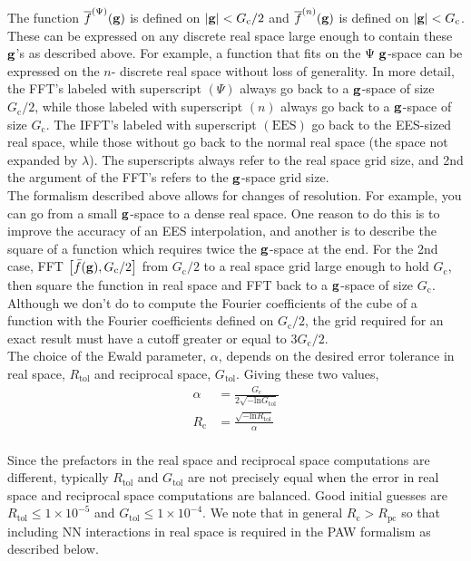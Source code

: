 \documentclass[paper=a4, fontsize=11pt]{article} %
\numberwithin{equation}{section} %
\numberwithin{figure}{section} %
\numberwithin{table}{section} %
\newcommand{\ol}{\overline}
\newcommand{\bg}{{\bf{g}}}
\newcommand{\rEES}{{\mathrm{EES}}}
\newcommand{\rtol}{{\mathrm{tol}}}
\newcommand{\Rc}{{R_{\mathrm{c}}}}
\newcommand{\Gc}{{G_{\mathrm{c}}}}
\newcommand{\Rpc}{{R_{\mathrm{pc}}}}
\begin{document}
The function $\ol f^{(\Psi)}(\bg)$ is defined on $|\bg| < \Gc/2$ and $\ol f^{(n)}(\bg)$ is defined on $|\bg| < \Gc$. These can be expressed on any discrete real space large enough to contain these $\bg$'s as described above. For example, a function that fits on the $\Psi\ \bg$-space can be expressed on the $n$- discrete real space without loss of generality. In more detail, the FFT's labeled with superscript $(\Psi)$ always go back to a $\bg$-space of size $\Gc/2$, while those labeled with superscript $(n)$ always go back to a $\bg$-space of size $\Gc$. The IFFT's labeled with superscript $(\rEES)$ go back to the EES-sized real space, while those without go back to the normal real space (the space not expanded by $\lambda$). The superscripts always refer to the real space grid size, and 2nd the argument of the FFT's refers to the $\bg$-space grid size. \\

The formalism described above allows for changes of resolution. For example, you can go from a small $\bg$-space to a dense real space. One reason to do this is to improve the accuracy of an EES interpolation, and another is to describe the square of a function which requires twice the $\bg$-space at the end. For the 2nd case, FFT $\left[ \bar f(\bg), \Gc/2\right]$ from $\Gc/2$ to a real space grid large enough to hold $\Gc$, then square the function in real space and FFT back to a $\bg$-space of size $\Gc$. Although we don't do to compute the Fourier coefficients of the cube of a function with the Fourier coefficients defined on $\Gc/2$, the grid required for an exact result must have a cutoff greater or equal to $3\Gc/2$. \\

The choice of the Ewald parameter, $\alpha$, depends on the desired error tolerance in real space, $R_\rtol$ and reciprocal space, $G_\rtol$. Giving these two values,
\begin{equation}\label{eq:Rcdef}
\begin{split}
         \alpha &= \frac{\Gc}{2\sqrt{-\mathrm{ln} G_\rtol}}\\
          \Rc     &= \frac{\sqrt{-\mathrm{ln} R_\rtol}}{\alpha}\\
\end{split}
\end{equation}


Since the prefactors in the real space and reciprocal space computations are different, typically $R_\rtol$ and $G_\rtol$ are not precisely equal when the error in real space and reciprocal space computations are balanced. Good initial guesses are $R_\rtol \leq 1 \times 10^{-5}$ and $G_\rtol \leq 1 \times 10^{-4}$.  We note that in general $\Rc > \Rpc$ so that including NN interactions in real space is required in the PAW formalism as described below.\\
\end{document}
